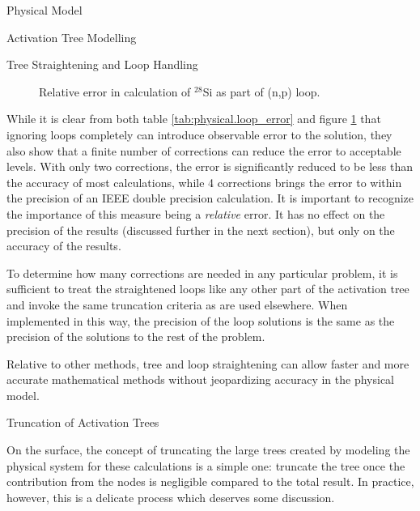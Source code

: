 \begin{chapter}{Physical Model\label{chap:physical}}
\begin{section}{Activation Tree Modelling\label{sec:physical.chains}}
\begin{subsection}{Tree Straightening and Loop Handling}
    \begin{figure}[htbp]
      \begin{center}
        \leavevmode
        \caption{Relative error in calculation of $^{28}$Si as part of (n,p) loop.}
        \label{fig:physical.loop_error}
      \end{center}
    \end{figure}

    While it is clear from both table \ref{tab:physical.loop_error}
    and figure \ref{fig:physical.loop_error} that ignoring loops
    completely can introduce observable error to the solution, they
    also show that a finite number of corrections can reduce the error
    to acceptable levels.  With only two corrections, the error is
    significantly reduced to be less than the accuracy of most
    calculations, while 4 corrections brings the error to within the
    precision of an IEEE double precision calculation.  It is
    important to recognize the importance of this measure being a
    \textsl{relative} error.  It has no effect on the precision of the
    results (discussed further in the next section), but only on the
    accuracy of the results.
    
    To determine how many corrections are needed in any particular
    problem, it is sufficient to treat the straightened loops like any
    other part of the activation tree and invoke the same truncation
    criteria as are used elsewhere.  When implemented in this way, the
    precision of the loop solutions is the same as the precision of
    the solutions to the rest of the problem.
    
    Relative to other methods, tree and loop straightening can allow
    faster and more accurate mathematical methods without jeopardizing
    accuracy in the physical model.
  \end{subsection}

  \begin{subsection}{Truncation of Activation Trees}
    
    On the surface, the concept of truncating the large trees created
    by modeling the physical system for these calculations is a simple
    one: truncate the tree once the contribution from the nodes is
    negligible compared to the total result.  In practice, however,
    this is a delicate process which deserves some discussion.
    

\end{subsection}
\end{section}
\end{chapter}
